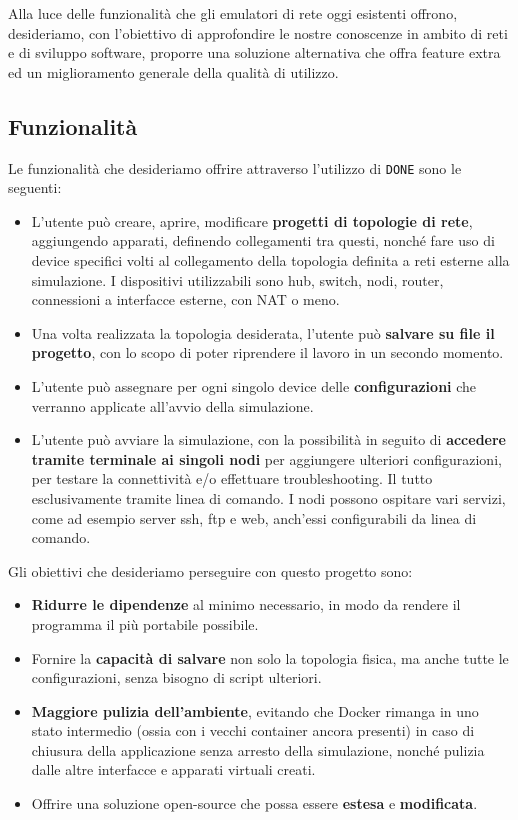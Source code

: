 Alla luce delle funzionalità che gli emulatori di rete oggi esistenti offrono, desideriamo, con l'obiettivo di approfondire le nostre conoscenze in ambito di reti e di sviluppo software, proporre una soluzione alternativa che offra feature extra ed un miglioramento generale della qualità di utilizzo.
\subsection{Funzionalità}
Le funzionalità che desideriamo offrire attraverso l'utilizzo di \texttt{DONE} sono le seguenti: 
\begin{itemize}
    \item L'utente può creare, aprire, modificare \textbf{progetti di topologie di rete}, aggiungendo apparati, definendo collegamenti tra questi, nonché fare uso di device specifici volti al collegamento della topologia definita a reti esterne alla simulazione. I dispositivi utilizzabili sono hub, switch, nodi, router, connessioni a interfacce esterne, con NAT o meno.
    \item Una volta realizzata la topologia desiderata, l'utente può \textbf{salvare su file il progetto}, con lo scopo di poter riprendere il lavoro in un secondo momento.
    \item L'utente può assegnare per ogni singolo device delle \textbf{configurazioni} che verranno applicate all'avvio della simulazione.
    \item L'utente può avviare la simulazione, con la possibilità in seguito di \textbf{accedere tramite terminale ai singoli nodi} per aggiungere ulteriori configurazioni, per testare la connettività e/o effettuare troubleshooting. Il tutto esclusivamente tramite linea di comando. I nodi possono ospitare vari servizi, come ad esempio server ssh, ftp e web, anch'essi configurabili da linea di comando. 
\end{itemize}
Gli obiettivi che desideriamo perseguire con questo progetto sono:
\begin{itemize}
    \item \textbf{Ridurre le dipendenze} al minimo necessario, in modo da rendere il programma il più portabile possibile.
    \item Fornire la \textbf{capacità di salvare} non solo la topologia fisica, ma anche tutte le configurazioni, senza bisogno di script ulteriori.
    \item \textbf{Maggiore pulizia dell'ambiente}, evitando che Docker rimanga in uno stato intermedio (ossia con i vecchi container ancora presenti) in caso di chiusura della applicazione senza arresto della simulazione, nonché pulizia dalle altre interfacce e apparati virtuali creati.
    \item Offrire una soluzione open-source che possa essere \textbf{estesa} e \textbf{modificata}.
\end{itemize}
